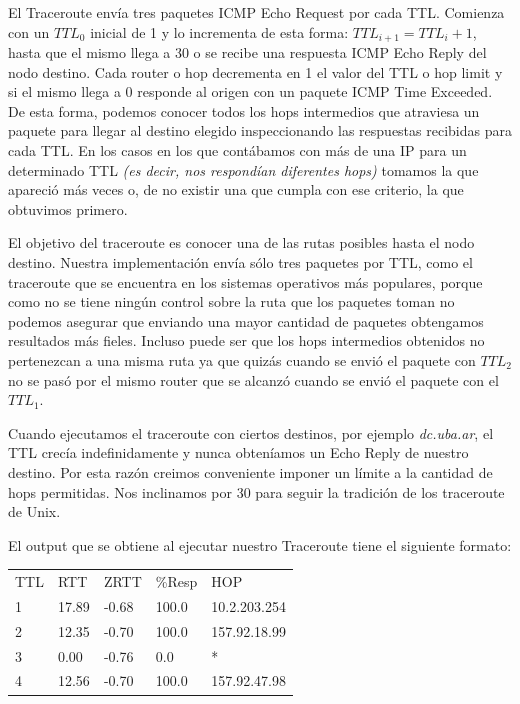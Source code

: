 El Traceroute envía tres paquetes ICMP Echo Request por cada TTL. Comienza
con un $TTL_0$ inicial de 1 y lo incrementa de esta forma: $TTL_{i+1} = TTL_i + 1$,
hasta que el mismo llega a 30 o se recibe una respuesta ICMP Echo Reply
del nodo destino. Cada router o hop decrementa en 1 el valor del TTL o hop limit y si
el mismo llega a 0 responde al origen con un paquete ICMP Time Exceeded. De esta forma,
podemos conocer todos los hops intermedios que atraviesa un paquete para llegar al destino
elegido inspeccionando las respuestas recibidas para cada TTL.
En los casos en los que contábamos con más
de una IP para un determinado TTL \textit{(es decir, nos respondían diferentes hops)} tomamos la que apareció más veces o, de no existir
una que cumpla con ese criterio, la que obtuvimos primero.\\
\par
El objetivo del traceroute es conocer una de las rutas posibles hasta el nodo destino.
Nuestra implementación envía sólo tres paquetes
por TTL, como el traceroute que se encuentra en los sistemas operativos más populares,
porque como no se tiene ningún control sobre la ruta que los paquetes toman no podemos
asegurar que enviando una mayor cantidad de paquetes obtengamos resultados más fieles.
Incluso puede ser que los hops intermedios obtenidos no pertenezcan a una misma ruta
ya que quizás cuando se envió el paquete con $TTL_2$ no se pasó por el mismo router que
se alcanzó cuando se envió el paquete con el $TTL_1$.\\
\par
Cuando ejecutamos el traceroute con ciertos destinos, por ejemplo \textit{dc.uba.ar},
 el TTL crecía indefinidamente y nunca obteníamos un Echo Reply de nuestro destino.
Por esta razón creimos conveniente imponer un límite a la cantidad de hops permitidas.
Nos inclinamos por 30 para seguir la tradición de los traceroute de Unix.\\
\par

El output que se obtiene al ejecutar nuestro Traceroute tiene el siguiente formato:

\begin{table}[H]
    \begin{tabular}{lllll}
     TTL &  RTT     &  ZRTT         &   \%Resp       &  HOP            \\
    1    & 17.89    &  -0.68        &  100.0         &  10.2.203.254   \\
    2    & 12.35    &  -0.70        &  100.0         &  157.92.18.99   \\
    3    & 0.00     &  -0.76        &  0.0           &  *              \\
    4    & 12.56    &  -0.70        &  100.0         &  157.92.47.98   \\
    \end{tabular}
\end{table}

